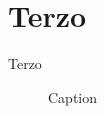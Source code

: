 \chapter{Terzo}
Terzo

\begin{figure}[h]
    \centering
   
    \caption{Caption}
    \label{fig:enter-label}
\end{figure}